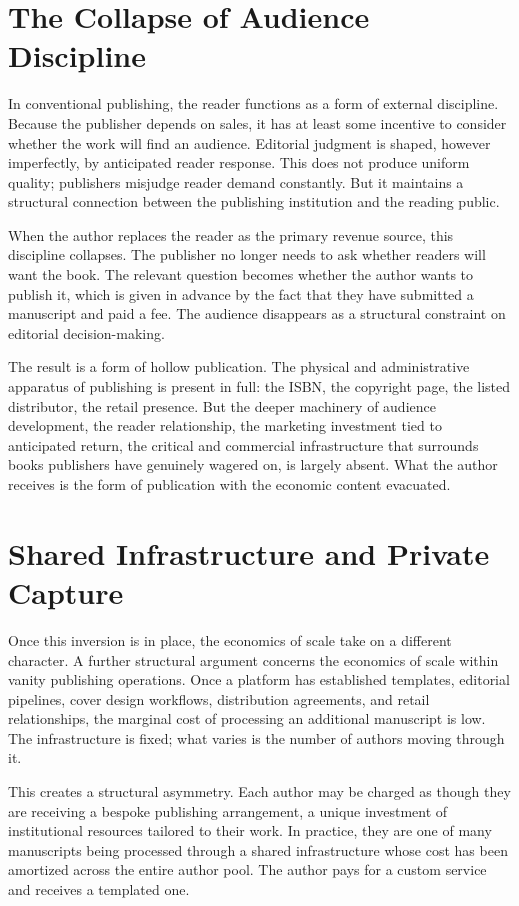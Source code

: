 \documentclass[12pt, a4paper]{article}
\begin{document}
\section{The Collapse of Audience Discipline}

In conventional publishing, the reader functions as a form of external discipline. Because the publisher depends on sales, it has at least some incentive to consider whether the work will find an audience. Editorial judgment is shaped, however imperfectly, by anticipated reader response. This does not produce uniform quality; publishers misjudge reader demand constantly. But it maintains a structural connection between the publishing institution and the reading public.

When the author replaces the reader as the primary revenue source, this discipline collapses. The publisher no longer needs to ask whether readers will want the book. The relevant question becomes whether the author wants to publish it, which is given in advance by the fact that they have submitted a manuscript and paid a fee. The audience disappears as a structural constraint on editorial decision-making.

The result is a form of hollow publication. The physical and administrative apparatus of publishing is present in full: the ISBN, the copyright page, the listed distributor, the retail presence. But the deeper machinery of audience development, the reader relationship, the marketing investment tied to anticipated return, the critical and commercial infrastructure that surrounds books publishers have genuinely wagered on, is largely absent. What the author receives is the form of publication with the economic content evacuated.

\section{Shared Infrastructure and Private Capture}

Once this inversion is in place, the economics of scale take on a different character. A further structural argument concerns the economics of scale within vanity publishing operations. Once a platform has established templates, editorial pipelines, cover design workflows, distribution agreements, and retail relationships, the marginal cost of processing an additional manuscript is low. The infrastructure is fixed; what varies is the number of authors moving through it.

This creates a structural asymmetry. Each author may be charged as though they are receiving a bespoke publishing arrangement, a unique investment of institutional resources tailored to their work. In practice, they are one of many manuscripts being processed through a shared infrastructure whose cost has been amortized across the entire author pool. The author pays for a custom service and receives a templated one.
\end{document}

